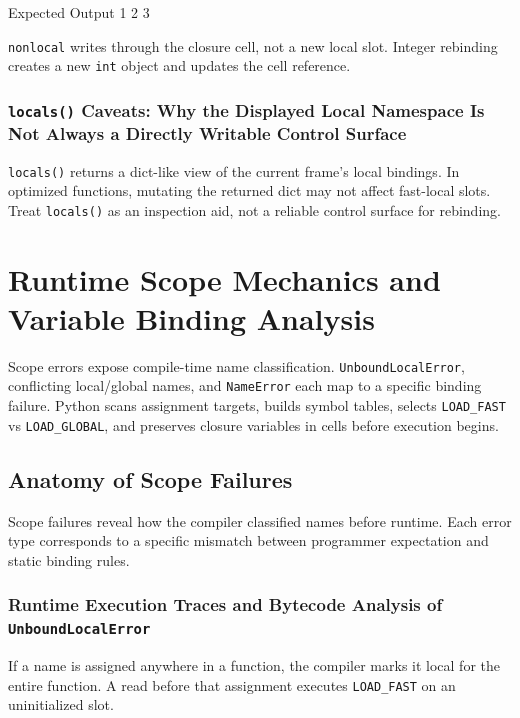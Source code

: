 \documentclass[a4paper,twoside]{report}
\begin{document}
\begin{iobox}{Expected Output}
1 2 3 \\
\end{iobox}




\texttt{nonlocal} writes through the closure cell, not a new local slot. Integer rebinding creates a new \texttt{int} object and updates the cell reference.

\subsubsection{\texttt{locals()} Caveats: Why the Displayed Local Namespace Is Not Always a Directly Writable Control Surface}

\texttt{locals()} returns a dict-like view of the current frame's local bindings. In optimized functions, mutating the returned dict may not affect fast-local slots. Treat \texttt{locals()} as an inspection aid, not a reliable control surface for rebinding.


\section{Runtime Scope Mechanics and Variable Binding Analysis}

Scope errors expose compile-time name classification. \texttt{UnboundLocalError}, conflicting local/global names, and \texttt{NameError} each map to a specific binding failure. Python scans assignment targets, builds symbol tables, selects \texttt{LOAD\_FAST} vs \texttt{LOAD\_GLOBAL}, and preserves closure variables in cells before execution begins.


\subsection{Anatomy of Scope Failures}

Scope failures reveal how the compiler classified names before runtime. Each error type corresponds to a specific mismatch between programmer expectation and static binding rules.

\subsubsection{Runtime Execution Traces and Bytecode Analysis of \texttt{UnboundLocalError}}

If a name is assigned anywhere in a function, the compiler marks it local for the entire function. A read before that assignment executes \texttt{LOAD\_FAST} on an uninitialized slot.
\end{document}
